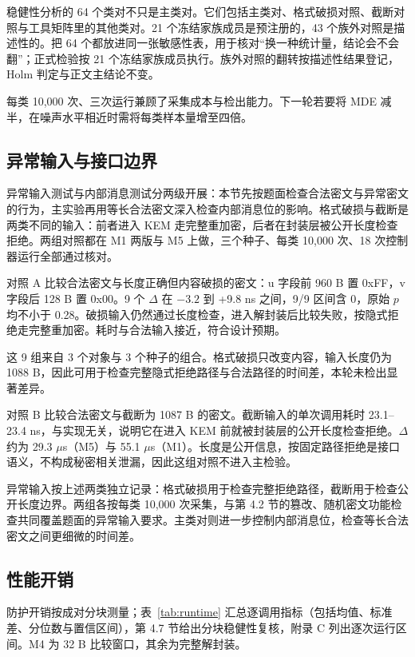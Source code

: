 稳健性分析的 64 个类对不只是主类对。它们包括主类对、格式破损对照、截断对照与工具矩阵里的其他类对。21 个冻结家族成员是预注册的，43 个族外对照是描述性的。把 64 个都放进同一张敏感性表，用于核对“换一种统计量，结论会不会翻”；正式检验按 21 个冻结家族成员执行。族外对照的翻转按描述性结果登记，Holm 判定与正文主结论不变。

每类 10,000 次、三次运行兼顾了采集成本与检出能力。下一轮若要将 MDE 减半，在噪声水平相近时需将每类样本量增至四倍。

\subsection{异常输入与接口边界}

异常输入测试与内部消息测试分两级开展：本节先按题面检查合法密文与异常密文的行为，主实验再用等长合法密文深入检查内部消息位的影响。格式破损与截断是两类不同的输入：前者进入 KEM 走完整重加密，后者在封装层被公开长度检查拒绝。两组对照都在 M1 两版与 M5 上做，三个种子、每类 10,000 次、18 次控制器运行全部通过核对。%

对照 A 比较合法密文与长度正确但内容破损的密文：u 字段前 960 B 置 0xFF，v 字段后 128 B 置 0x00。9 个 $\Delta$ 在 $-3.2$ 到 +9.8 ns 之间，9/9 区间含 0，原始 $p$ 均不小于 0.28。破损输入仍然通过长度检查，进入解封装后比较失败，按隐式拒绝走完整重加密。耗时与合法输入接近，符合设计预期。

这 9 组来自 3 个对象与 3 个种子的组合。格式破损只改变内容，输入长度仍为 1088 B，因此可用于检查完整隐式拒绝路径与合法路径的时间差，本轮未检出显著差异。

对照 B 比较合法密文与截断为 1087 B 的密文。截断输入的单次调用耗时 23.1--23.4 ns，与实现无关，说明它在进入 KEM 前就被封装层的公开长度检查拒绝。$\Delta$ 约为 29.3 $\mu$s（M5）与 55.1 $\mu$s（M1）。长度是公开信息，按固定路径拒绝是接口语义，不构成秘密相关泄漏，因此这组对照不进入主检验。

异常输入按上述两类独立记录：格式破损用于检查完整拒绝路径，截断用于检查公开长度边界。两组各按每类 10,000 次采集，与第 4.2 节的篡改、随机密文功能检查共同覆盖题面的异常输入要求。主类对则进一步控制内部消息位，检查等长合法密文之间更细微的时间差。

\subsection{性能开销}

防护开销按成对分块测量；表~\ref{tab:runtime} 汇总逐调用指标（包括均值、标准差、分位数与置信区间），第 4.7 节给出分块稳健性复核，附录 C 列出逐次运行区间。M4 为 32 B 比较窗口，其余为完整解封装。%

